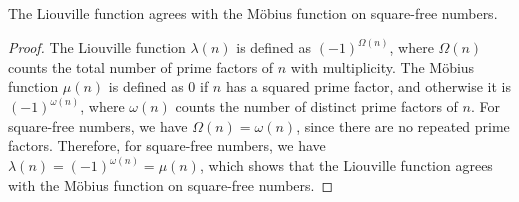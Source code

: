 \begin{theorem}
\label{liouville_eq_moebius_on_squarefree}
\leanok
The Liouville function agrees with the Möbius function on square-free numbers.
\end{theorem}
\begin{proof}
\leanok
The Liouville function $\lambda(n)$ is defined as $(-1)^{\Omega(n)}$, where $\Omega(n)$ counts the total number of prime factors of $n$ with multiplicity. The Möbius function $\mu(n)$ is defined as $0$ if $n$ has a squared prime factor, and otherwise it is $(-1)^{\omega(n)}$, where $\omega(n)$ counts the number of distinct prime factors of $n$. For square-free numbers, we have $\Omega(n) = \omega(n)$, since there are no repeated prime factors. Therefore, for square-free numbers, we have $\lambda(n) = (-1)^{\omega(n)} = \mu(n)$, which shows that the Liouville function agrees with the Möbius function on square-free numbers.
\end{proof}
